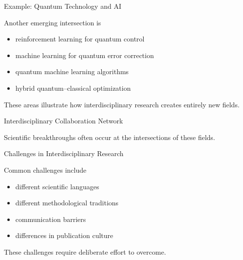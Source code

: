 \documentclass{beamer}
\begin{document}

\begin{frame}{Example: Quantum Technology and AI}

Another emerging intersection is

\begin{itemize}
\item reinforcement learning for quantum control
\item machine learning for quantum error correction
\item quantum machine learning algorithms
\item hybrid quantum–classical optimization
\end{itemize}

These areas illustrate how interdisciplinary research
creates entirely new fields.

\end{frame}


\begin{frame}{Interdisciplinary Collaboration Network}

\begin{center}


\end{center}

Scientific breakthroughs often occur at the
intersections of these fields.

\end{frame}


\begin{frame}{Challenges in Interdisciplinary Research}

Common challenges include

\begin{itemize}
\item different scientific languages
\item different methodological traditions
\item communication barriers
\item differences in publication culture
\end{itemize}

These challenges require deliberate effort
to overcome.

\end{frame}
\end{document}
